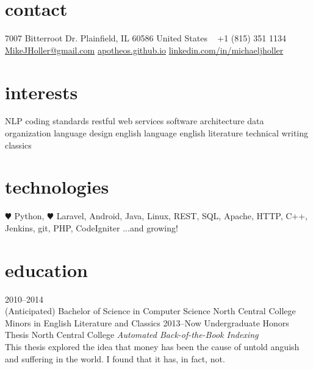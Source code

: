 \documentclass[]{friggeri-cv} %
\begin{document}


\begin{aside} %
\section{contact}
7007 Bitterroot Dr.
Plainfield, IL 60586
United States
~
+1 (815) 351 1134
~
\href{mailto:mikejholler@gmail.com}{MikeJHoller@gmail.com}
\href{http://apotheos.github.io}{apotheos.github.io}
\href{http://www.linkedin.com/in/michaeljholler}{linkedin.com/in/michaeljholler}
\section{interests}
NLP
coding standards
restful web services
software architecture
data organization
language design
english language
english literature
technical writing
classics
\section{technologies}
{\color{red} $\varheartsuit$} Python, {\color{red} $\varheartsuit$} Laravel,
Android, Java, Linux,
REST, SQL, Apache,
HTTP, C++, Jenkins,
git, PHP, CodeIgniter
...and growing!
\end{aside}


\section{education}

\begin{entrylist}
\entry
{2010--2014 \\(Anticipated)}
{Bachelor of Science {\normalfont in Computer Science}}
{North Central College}
{Minors in English Literature and Classics}
\entry
{2013--Now}
{Undergraduate {\normalfont Honors Thesis}}
{North Central College}
{\emph{Automated Back-of-the-Book Indexing} \\
This thesis explored the idea that money has been the cause of untold anguish and suffering in the world. I found that it has, in fact, not.}
\end{entrylist}
\end{document}
